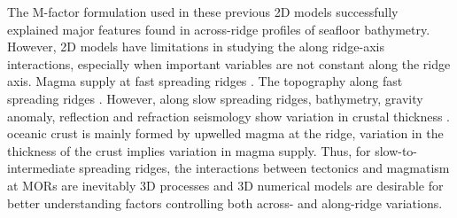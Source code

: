 \documentclass[12pt]{article}
\begin{document}
The M-factor formulation used in these previous 2D models successfully explained major features found in across-ridge profiles of seafloor bathymetry. However, 2D models have limitations in studying the along ridge-axis interactions, especially when important variables are not constant along the ridge axis. Magma supply at fast spreading ridges . The  topography along fast spreading ridges . However, along slow spreading ridges, bathymetry, gravity anomaly, reflection and refraction seismology  show  variation in crustal thickness \citep{Ryan2009, Chen1999, Lin1990,Tolstoy1993}.  oceanic crust is mainly formed by upwelled magma at the ridge, variation in the thickness of the crust implies variation in magma supply.
 Thus, for slow-to-intermediate spreading ridges, the interactions between tectonics and magmatism at MORs are inevitably 3D processes and 3D numerical models are desirable for better understanding factors controlling both across- and along-ridge variations. 
\end{document}

